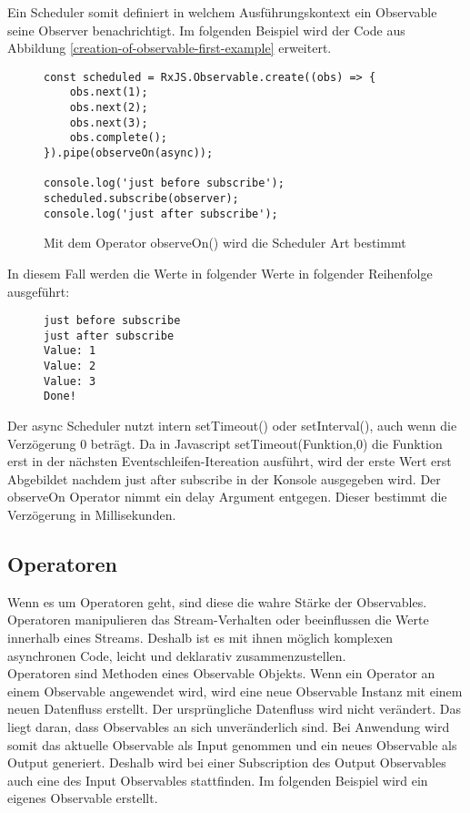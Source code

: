\noindent
Ein Scheduler somit definiert in welchem Ausführungskontext ein Observable seine Observer benachrichtigt. Im folgenden Beispiel wird der Code aus Abbildung \ref{creation-of-observable-first-example} erweitert.

\begin{figure}[H]
\begin{lstlisting}[basicstyle=\small]
const scheduled = RxJS.Observable.create((obs) => {
    obs.next(1);
    obs.next(2);
    obs.next(3);
    obs.complete();
}).pipe(observeOn(async));

console.log('just before subscribe');
scheduled.subscribe(observer);
console.log('just after subscribe');
\end{lstlisting}
\caption{Mit dem Operator observeOn() wird die Scheduler Art bestimmt}
\end{figure}

\noindent
In diesem Fall werden die Werte in folgender Werte in folgender Reihenfolge ausgeführt:

\begin{figure}[H]
\begin{lstlisting}
just before subscribe
just after subscribe
Value: 1
Value: 2
Value: 3
Done!
\end{lstlisting}
\end{figure}

\noindent
Der async Scheduler nutzt intern setTimeout() oder setInterval(), auch wenn die Verzögerung 0 beträgt. Da in Javascript setTimeout(Funktion,0) die Funktion erst in der nächsten Eventschleifen-Itereation ausführt, wird der erste Wert erst Abgebildet nachdem \glqq just after subscribe\grqq{} in der Konsole ausgegeben wird. Der observeOn Operator nimmt ein delay Argument entgegen. Dieser bestimmt die Verzögerung in Millisekunden.

\subsection{Operatoren}
Wenn es um Operatoren geht, sind diese die wahre Stärke der Observables. Operatoren manipulieren das Stream-Verhalten oder beeinflussen die Werte innerhalb eines Streams. Deshalb ist es mit ihnen möglich komplexen asynchronen Code, leicht und deklarativ zusammenzustellen.\\

\noindent
Operatoren sind Methoden eines Observable Objekts. Wenn ein Operator an einem Observable angewendet wird, wird eine neue Observable Instanz mit einem neuen Datenfluss erstellt. Der ursprüngliche Datenfluss wird nicht verändert. Das liegt daran, dass Observables an sich unveränderlich sind. Bei Anwendung wird somit das aktuelle Observable als Input genommen und ein neues Observable als Output generiert. Deshalb wird bei einer Subscription des Output Observables auch eine des Input Observables stattfinden. Im folgenden Beispiel wird ein eigenes Observable erstellt.

